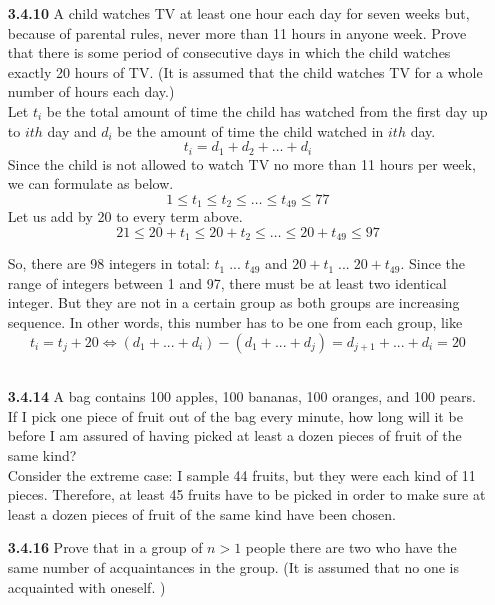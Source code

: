\documentclass[12pt]{article}
\begin{document}
\begin{enumerate}
\begin{itemize}
    \end{itemize}
     
    

    \item[\bf 3.4.10] A child watches TV at least one hour each day for seven weeks but, because of parental rules, never more than 11 hours in anyone week. Prove that there is some period of consecutive days in which the child watches exactly 20 hours of TV. (It is assumed that the child watches TV for a whole number of hours each day.)\\
    
    Let $t_i$ be the total amount of time the child has watched from the first day up to $ith$ day and $d_i$ be the amount of time the child watched in $ith$ day. 
    $$t_i = d_1+d_2+\ldots+d_i$$
    Since the child is not allowed to watch TV no more than 11 hours per week, we can formulate as below.
    $$1\le t_1\le t_2\le\ldots\le t_{49}\le 77$$
    Let us add by 20 to every term above.
    $$21\le 20+t_1\le 20+t_2\le\ldots\le 20+t_{49}\le 97$$
    
    So, there are 98 integers in total: $t_1\; ...\; t_{49}$ and $20+t_1\; ...\; 20+t_{49}$. Since the range of integers between 1 and 97, there must be at least two identical integer. But they are not in a certain group as both groups are increasing sequence. In other words, this number has to be one from each group, like
    $$t_i = t_j + 20 \Leftrightarrow (d_1+...+d_{i}) - (d_1+...+d_j) = d_{j+1}+...+d_i = 20$$\\
    
    \item[\bf 3.4.14] A bag contains 100 apples, 100 bananas, 100 oranges, and 100 pears. If I pick one piece of fruit out of the bag every minute, how long will it be before I am assured of having picked at least a dozen pieces of fruit of the same kind?\\
    
    Consider the extreme case: I sample 44 fruits, but they were each kind of 11 pieces. Therefore, at least 45 fruits have to be picked in order to make sure at least a dozen pieces of fruit of the same kind have been chosen.\\
    
    \item[\bf 3.4.16] Prove that in a group of $n > 1$ people there are two who have the same number of acquaintances in the group. (It is assumed that no one is acquainted with oneself. )\\
    

\end{enumerate}
\end{document}
